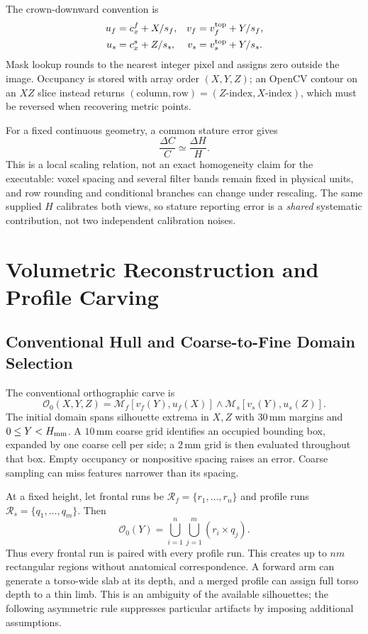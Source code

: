 \documentclass[11pt,a4paper]{article}
\numberwithin{equation}{section}
\begin{document}
The crown-downward convention is
\begin{align}
u_f&=c_x^f+X/s_f,&v_f&=v_f^{\rm top}+Y/s_f,\nonumber\\
u_s&=c_x^s+Z/s_s,&v_s&=v_s^{\rm top}+Y/s_s.
\label{eq:projection_coordinates}
\end{align}
Mask lookup rounds to the nearest integer pixel and assigns zero outside the image. Occupancy is stored with array order $(X,Y,Z)$; an OpenCV contour on an $XZ$ slice instead returns $(\text{column},\text{row})=(Z\text{-index},X\text{-index})$, which must be reversed when recovering metric points.

For a fixed continuous geometry, a common stature error gives
\begin{equation}
\frac{\Delta C}{C}\simeq\frac{\Delta H}{H}.
\label{eq:scale_prop}
\end{equation}
This is a local scaling relation, not an exact homogeneity claim for the executable: voxel spacing and several filter bands remain fixed in physical units, and row rounding and conditional branches can change under rescaling. The same supplied $H$ calibrates both views, so stature reporting error is a \emph{shared} systematic contribution, not two independent calibration noises.

\section{Volumetric Reconstruction and Profile Carving}
\subsection{Conventional Hull and Coarse-to-Fine Domain Selection}
\label{subsec:carving}
The conventional orthographic carve is
\begin{equation}
\mathcal O_0(X,Y,Z)=\mathcal M_f[v_f(Y),u_f(X)]\wedge\mathcal M_s[v_s(Y),u_s(Z)].
\label{eq:cartesian_carve}
\end{equation}
The initial domain spans silhouette extrema in $X,Z$ with $30$\,mm margins and $0\le Y<H_{\rm mm}$. A $10$\,mm coarse grid identifies an occupied bounding box, expanded by one coarse cell per side; a $2$\,mm grid is then evaluated throughout that box. Empty occupancy or nonpositive spacing raises an error. Coarse sampling can miss features narrower than its spacing.

At a fixed height, let frontal runs be $\mathcal R_f=\{r_1,\ldots,r_n\}$ and profile runs $\mathcal R_s=\{q_1,\ldots,q_m\}$. Then
\begin{equation}
\mathcal O_0(Y)=\bigcup_{i=1}^n\bigcup_{j=1}^m(r_i\times q_j).
\end{equation}
Thus every frontal run is paired with every profile run. This creates up to $nm$ rectangular regions without anatomical correspondence. A forward arm can generate a torso-wide slab at its depth, and a merged profile can assign full torso depth to a thin limb. This is an ambiguity of the available silhouettes; the following asymmetric rule suppresses particular artifacts by imposing additional assumptions.
\end{document}
